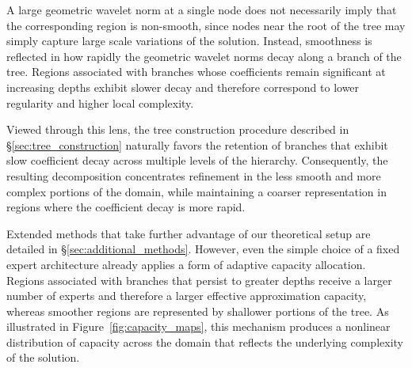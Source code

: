 A large geometric wavelet norm at a single node does not necessarily
imply that the corresponding region is non-smooth, since nodes near the root
of the tree may simply capture large scale variations of the solution.
Instead, smoothness is reflected in how rapidly the geometric wavelet norms
decay along a branch of the tree. Regions associated with branches whose
coefficients remain significant at increasing depths exhibit slower decay and
therefore correspond to lower regularity and higher local complexity.

Viewed through this lens, the tree construction procedure described
in \S\ref{sec:tree_construction} naturally favors the retention of
branches that exhibit slow coefficient decay across multiple levels of the
hierarchy. Consequently, the resulting decomposition concentrates refinement
in the less smooth and more complex portions of the domain, while maintaining
a coarser representation in regions where the coefficient decay is more rapid.

Extended methods that take further advantage of our theoretical setup are detailed in \S\ref{sec:additional_methods}. However, even the
simple choice of a fixed expert architecture already applies a form of
adaptive capacity allocation. Regions associated with branches that persist to
greater depths receive a larger number of experts and therefore a larger
effective approximation capacity, whereas smoother regions are represented by
shallower portions of the tree. As illustrated in
Figure~\ref{fig:capacity_maps}, this mechanism produces a nonlinear
distribution of capacity across the domain that reflects the underlying
complexity of the solution.

\vspace{0.5em}

